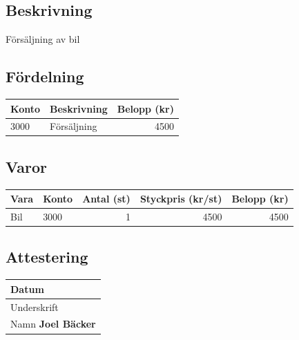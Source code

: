 \documentclass{article}
\newcommand{\namn}{Joel Bäcker}
\newcommand{\beskrivning}{Försäljning av bil}
\newcommand{\fordelning}{3000 & Försäljning & 4500 \\}
\newcommand{\varor}{Bil & 3000 & 1 & 4500 & 4500 \\}
\begin{document}
\subsection*{Beskrivning}
\beskrivning

\subsection*{Fördelning}
\begin{tabular}{p{0.6in}p{2in}r}
    Konto & Beskrivning& Belopp (kr)\\ \hline
    \fordelning
\end{tabular}

\subsection*{Varor}
\begin{longtable}[l]{llrrr}
    Vara & Konto & Antal (st) & Styckpris (kr/st) & Belopp (kr) \\ \hline
    \varor
\end{longtable}

\subsection*{Attestering}
\begin{tabular}{|p{2.5in}|}
    \hline
    {\footnotesize Datum} \newline \\
    \hline
    {\footnotesize Underskrift} \newline \newline\\
    \hline
    {\footnotesize Namn} \newline \textbf{\namn} \\
    \hline
\end{tabular}
\end{document}
